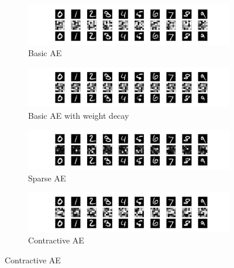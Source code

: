 \documentclass[preprint,5p,compress]{elsarticle}
\begin{document}
\begin{figure}[htbp]
  \centering
  \begin{subfigure}{0.48\textwidth}
    \includegraphics[width=\textwidth,trim={14em 0 14em 0},clip]{basic-36-rmsprop-xent.pdf}
    \caption{\label{Fig.mnist.basic}Basic AE}
  \end{subfigure}
  \hfill
  \begin{subfigure}{0.48\textwidth}
    \includegraphics[width=\textwidth,trim={14em 0 14em 0},clip]{basic-wd-36-rmsprop-xent.pdf}
    \caption{\label{Fig.mnist.wd}Basic AE with weight decay}
  \end{subfigure}

  \begin{subfigure}{0.48\textwidth}
    \includegraphics[width=\textwidth,trim={14em 0 14em 0},clip]{sparse-36-rmsprop-xent.pdf}
    \caption{\label{Fig.mnist.sparse}Sparse AE}
  \end{subfigure}
  \hfill
  \begin{subfigure}{0.48\textwidth}
    \includegraphics[width=\textwidth,trim={14em 0 14em 0},clip]{contractive-36-rmsprop-xent.pdf}
    \caption{\label{Fig.mnist.contractive}Contractive AE}
  \end{subfigure}
  

\end{figure}
\end{document}
